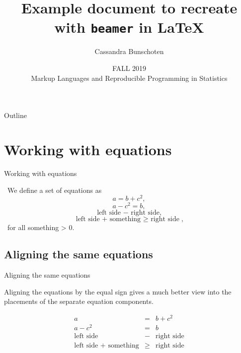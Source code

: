 \documentclass[aspectratio=169]{beamer}
\title[Your Short Title]{Example document to recreate with \texttt{beamer} in \LaTeX{}}
\author{Cassandra Bunschoten}
\date{FALL 2019 \\
Markup Languages and Reproducible Programming in Statistics}
\begin{document}
\begin{frame}
  \titlepage
\end{frame}

\begin{frame}{Outline}
\tableofcontents
\end{frame}

\section{Working with equations}

\begin{frame}{Working with equations}

\vskip 1cm
\
We define a set of equations as
\begin{equation}
a = b + c^2,
\end{equation}
\begin{equation}
a - c^2 = b,
\end{equation}
\begin{equation}
    \text{left side $-$ right side,}
\end{equation}
\begin{equation}
    \text{left side + something $\geq$ right side},
\end{equation}
\
for all something > 0.

\vskip 2cm

\end{frame}

\subsection{Aligning the same equations}

\begin{frame}{Aligning the same equations}

\vskip 1cm
Aligning the equations by the equal sign gives a much better view into the placements of the separate equation components.

\begin{eqnarray}
a &=& b + c^2 \\
a - c^2 &=& b \\
\text{left side} &-& \text{right side} \\
\text{left side + something} &\geq& \text{right side}
\end{eqnarray}

\vskip 2cm

\end{frame}
\end{document}
